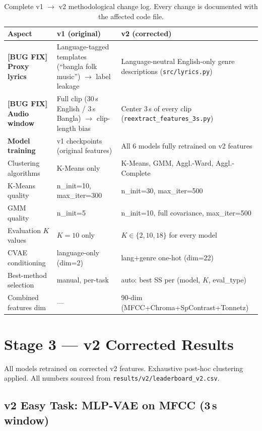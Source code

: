 \documentclass{article}
\begin{document}
\begin{table}[H]
\centering
\caption{Complete v1 $\to$ v2 methodological change log. Every change is documented
with the affected code file.}
\label{tab:changelist}
\small
\begin{tabular}{p{3.5cm}p{4.3cm}p{4.8cm}}
\toprule
\textbf{Aspect} & \textbf{v1 (original)} & \textbf{v2 (corrected)} \\
\midrule
\textbf{[BUG FIX] Proxy lyrics} &
Language-tagged templates (``bangla folk music'') $\to$ label leakage &
Language-neutral English-only genre descriptions (\texttt{src/lyrics.py}) \\
\textbf{[BUG FIX] Audio window} &
Full clip (30\,s English / 3\,s Bangla) $\to$ clip-length bias &
Center 3\,s of every clip (\texttt{reextract\_features\_3s.py}) \\
\textbf{Model training} &
v1 checkpoints (original features) &
All 6 models fully retrained on v2 features \\
Clustering algorithms & K-Means only &
K-Means, GMM, Aggl.-Ward, Aggl.-Complete \\
K-Means quality & n\_init=10, max\_iter=300 & n\_init=30, max\_iter=500 \\
GMM quality & n\_init=5 & n\_init=10, full covariance, max\_iter=500 \\
Evaluation $K$ values & $K\!=\!10$ only & $K\!\in\!\{2,10,18\}$ for every model \\
CVAE conditioning & language-only (dim=2) & lang+genre one-hot (dim=22) \\
Best-method selection & manual, per-task & auto: best SS per (model, $K$, eval\_type) \\
Combined features dim & --- & 90-dim (MFCC+Chroma+SpContrast+Tonnetz) \\
\bottomrule
\end{tabular}
\end{table}

\section{Stage 3 --- v2 Corrected Results}
\label{sec:stage3}

All models retrained on corrected v2 features. Exhaustive post-hoc clustering applied.
All numbers sourced from \texttt{results/v2/leaderboard\_v2.csv}.

\subsection{v2 Easy Task: MLP-VAE on MFCC (3\,s window)}
\end{document}
